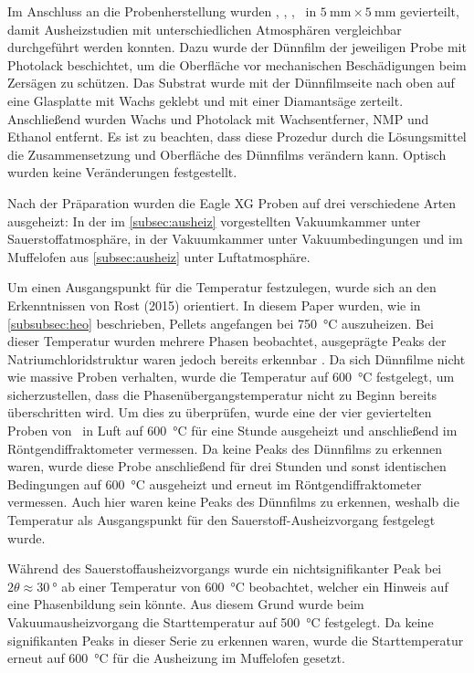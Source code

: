 Im Anschluss an die Probenherstellung wurden \samplethree, \sampleone, \sampletwo, \samplefour\ in
$\qty{5}{\milli\meter}\times \qty{5}{\milli\meter}$ gevierteilt, damit Ausheizstudien mit unterschiedlichen Atmosphären
vergleichbar durchgeführt werden konnten.
Dazu wurde der Dünnfilm der jeweiligen Probe mit Photolack beschichtet, um die Oberfläche vor
mechanischen Beschädigungen beim Zersägen zu schützen.
Das Substrat wurde mit der Dünnfilmseite nach oben auf eine Glasplatte mit Wachs geklebt und mit einer
Diamantsäge zerteilt.
Anschließend wurden Wachs und Photolack mit Wachsentferner, NMP und Ethanol entfernt.
Es ist zu beachten, dass diese Prozedur durch die Lösungsmittel die Zusammensetzung und Oberfläche des Dünnfilms
verändern kann.
Optisch wurden keine Veränderungen festgestellt.

Nach der Präparation wurden die Eagle XG Proben auf drei verschiedene Arten ausgeheizt:
In der im \cref{subsec:ausheiz} vorgestellten Vakuumkammer unter Sauerstoffatmosphäre, in der Vakuumkammer unter
Vakuumbedingungen und im Muffelofen aus \cref{subsec:ausheiz} unter Luftatmosphäre.

Um einen Ausgangspunkt für die Temperatur festzulegen, wurde sich an den Erkenntnissen von Rost (2015) orientiert.
In diesem Paper wurden, wie in \cref{subsubsec:heo} beschrieben, Pellets angefangen bei \qty{750}{\degreeCelsius}
auszuheizen.
Bei dieser Temperatur wurden mehrere Phasen beobachtet, ausgeprägte Peaks der Natriumchloridstruktur waren jedoch
bereits erkennbar \autocite{Rost2015}.
Da sich Dünnfilme nicht wie massive Proben verhalten, wurde die Temperatur auf \qty{600}{\degreeCelsius} festgelegt,
um sicherzustellen, dass die Phasenübergangstemperatur nicht zu Beginn bereits überschritten wird.
Um dies zu überprüfen, wurde eine der vier geviertelten Proben von \sampletwo\ in Luft auf \qty{600}{\degreeCelsius}
für eine Stunde ausgeheizt und anschließend im Röntgendiffraktometer vermessen.
Da keine Peaks des Dünnfilms zu erkennen waren, wurde diese Probe anschließend für drei Stunden und sonst identischen
Bedingungen auf \qty{600}{\degreeCelsius} ausgeheizt und erneut im Röntgendiffraktometer vermessen.
Auch hier waren keine Peaks des Dünnfilms zu erkennen, weshalb die Temperatur als Ausgangspunkt für den
Sauerstoff-Ausheizvorgang festgelegt wurde.

Während des Sauerstoffausheizvorgangs wurde ein nichtsignifikanter Peak bei ${2\theta}{\approx}\qty{30}{\degree}$
ab einer Temperatur von \qty{600}{\degreeCelsius} beobachtet, welcher ein Hinweis auf eine Phasenbildung sein könnte.
Aus diesem Grund wurde beim Vakuumausheizvorgang die Starttemperatur auf \qty{500}{\degreeCelsius} festgelegt.
Da keine signifikanten Peaks in dieser Serie zu erkennen waren, wurde die Starttemperatur erneut
auf \qty{600}{\degreeCelsius} für die Ausheizung im Muffelofen gesetzt.

